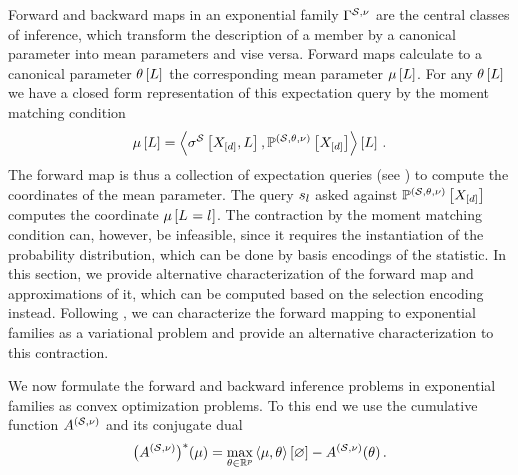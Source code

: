 Forward and backward maps in an exponential family $\Gamma^{\mathcal{S},\nu}$ are the central classes of inference, which transform the description of a member by a canonical parameter into mean parameters and vise versa.
Forward maps calculate to a canonical parameter $\theta\left[L\right]$ the corresponding mean parameter $\mu\left[L\right]$.
For any $\theta\left[L\right]$ we have a closed form representation of this expectation query by the moment matching condition
\begin{align*}
    \mu\left[L\right] = \left\langle \sigma^{\mathcal{S}}\left[X_{[d]},L\right],\mathbb{P}^{(\mathcal{S},\theta,\nu)}\left[X_{[d]}\right]\right\rangle \left[ L \right] \, .
\end{align*}
The forward map is thus a collection of expectation queries (see ) to compute the coordinates of the mean parameter.
The query $s_{l}$ asked against $\mathbb{P}^{(\mathcal{S},\theta,\nu)}\left[X_{[d]}\right]$ computes the coordinate $\mu\left[L_{}=l_{}\right]$.
The contraction by the moment matching condition can, however, be infeasible, since it requires the instantiation of the probability distribution, which can be done by basis encodings of the statistic.
In this section, we provide alternative characterization of the forward map and approximations of it, which can be computed based on the selection encoding instead.
Following \cite{wainwright_graphical_2008}, we can characterize the forward mapping to exponential families as a variational problem and provide an alternative characterization to this contraction.



We now formulate the forward and backward inference problems in exponential families as convex optimization problems.
To this end we use the cumulative function $A^{(\mathcal{S},\nu)}$ and its conjugate dual
\begin{align*}
    \big(A^{(\mathcal{S},\nu)}\big)^*(\mu) = \max_{\theta\in\mathbb{R}^{p}} \left\langle \mu,\theta\right\rangle \left[ \varnothing \right] - A^{(\mathcal{S},\nu)}(\theta) \, .
\end{align*}

